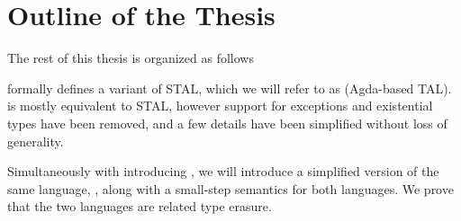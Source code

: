 





\section{Outline of the Thesis}

The rest of this thesis is organized as follows

\textbf{} formally defines a variant of STAL, which we will refer to
as \ATAL (Agda-based TAL). \ATAL is mostly equivalent to STAL, however support
for exceptions and existential types have been removed, and a few details have
been simplified without loss of generality.

Simultaneously with introducing \ATAL, we will introduce a simplified version of
the same language, \ATALe, along with a small-step semantics for both
languages. We prove that the two languages are related type erasure.

